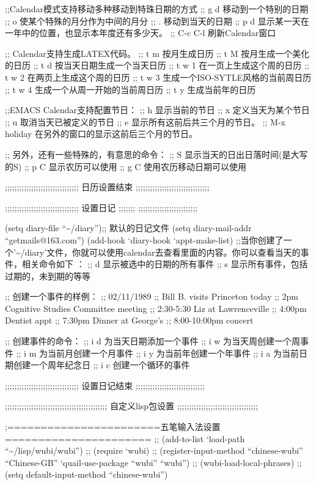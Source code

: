 \documentclass[11pt]{article}
\begin{document}
\begin{itemize}
;;Calendar模式支持移动多种移动到特珠日期的方式
;; g d     移动到一个特别的日期
;;  o      使某个特殊的月分作为中间的月分
;;  .      移动到当天的日期
;; p d     显示某一天在一年中的位置，也显示本年度还有多少天。
;; C-c C-l 刷新Calendar窗口

;; Calendar支持生成LATEX代码。
;; t m     按月生成日历
;; t M     按月生成一个美化的日历
;; t d     按当天日期生成一个当天日历
;; t w 1   在一页上生成这个周的日历
;; t w 2   在两页上生成这个周的日历
;; t w 3   生成一个ISO-SYTLE风格的当前周日历
;; t w 4   生成一个从周一开始的当前周日历
;; t y     生成当前年的日历

;;EMACS Calendar支持配置节日：
;; h       显示当前的节日
;; x       定义当天为某个节日
;; u       取消当天已被定义的节日
;; e       显示所有这前后共三个月的节日。
;; M-x holiday  在另外的窗口的显示这前后三个月的节日。


;; 另外，还有一些特殊的，有意思的命令：
;; S       显示当天的日出日落时间(是大写的S)
;; p C     显示农历可以使用
;; g C     使用农历移动日期可以使用


;;;;;;;;;;;;;;;;;;;;;;;;;;;;;;;  日历设置结束 ;;;;;;;;;;;;;;;;;;;;;;;;;;;;;;;

 

;;;;;;;;;;;;;;;;;;;;;;;;;;;;;;;  设置日记 ;;;;;;; ;;;;;;;;;;;;;;;;;;;;;;;;;

(setq diary-file ``\~{}/diary'');; 默认的日记文件
(setq diary-mail-addr ``getmails@163.com'')
(add-hook `diary-hook `appt-make-list)
;;当你创建了一个'\~{}/diary'文件，你就可以使用calendar去查看里面的内容。你可以查看当天的事件，相关命令如下 ：
;;  d     显示被选中的日期的所有事件
;;  s     显示所有事件，包括过期的，未到期的等等

;; 创建一个事件的样例：
;; 02/11/1989
;;     Bill B. visits Princeton today
;;     2pm Cognitive Studies Committee meeting
;;     2:30-5:30 Liz at Lawrenceville
;;     4:00pm Dentist appt
;;     7:30pm Dinner at George's
;;     8:00-10:00pm concert

;; 创建事件的命令：
;; i d   为当天日期添加一个事件
;; i w   为当天周创建一个周事件
;; i m   为当前月创建一个月事件
;; i y   为当前年创建一个年事件
;; i a   为当前日期创建一个周年纪念日
;; i c   创建一个循环的事件


;;;;;;;;;;;;;;;;;;;;;;;;;;;;;;;  设置日记结束  ;;;;;;;;;;;;;;;;;;;;;;;;;;;;;

 

;;;;;;;;;;;;;;;;;;;;;;;;;;;;;;;;;;;;;;;;;;; 自定义lisp包设置  ;;;;;;;;;;;;;;;;;;;;;;;;;;;;;;;;;;


;=======================五笔输入法设置======================
;; (add-to-list `load-path ``\~{}/lisp/wubi/wubi'')
;; (require `wubi)
;; (register-input-method ``chinese-wubi'' ``Chinese-GB'' `quail-use-package ``wubi'' ``wubi'')
;; (wubi-load-local-phrases)
;; (setq default-input-method ``chinese-wubi'')



\end{itemize}
\end{document}
